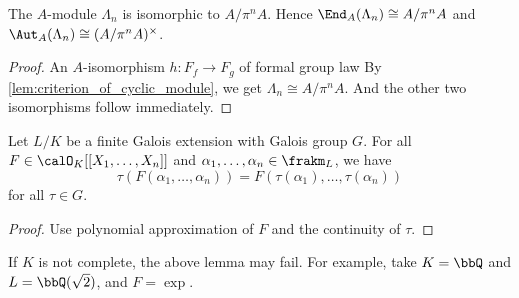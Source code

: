   \begin{proposition}
    The $A$-module $\Lambda_n$ is isomorphic to $A / \pi^n A$.
    Hence $\End_A(\Lambda_n) \cong A / \pi^n A$ and $\Aut_A(\Lambda_n) \cong (A / \pi^n A)^\times$.
  \end{proposition}
  \begin{proof}
    An $A$-isomorphism $h: F_f \to F_g$ of formal group law 
    \Yang{}
    By \cref{lem:criterion_of_cyclic_module}, we get $\Lambda_n \cong A / \pi^n A$.
    And the other two isomorphisms follow immediately.
  \end{proof}

  \begin{lemma}\label{lem:Galois_action_on_power_series_over_complete_field}
    Let $L/K$ be a finite Galois extension with Galois group $G$.
    For all $F \in \calO_K[[X_1, \ldots, X_n]]$ and $\alpha_1, \ldots, \alpha_n \in \frakm_L$, we have
    \[ \tau(F(\alpha_1, \ldots, \alpha_n)) = F(\tau(\alpha_1), \ldots, \tau(\alpha_n)) \]
    for all $\tau \in G$.
  \end{lemma}
  \begin{proof}
    Use polynomial approximation of $F$ and the continuity of $\tau$.
  \end{proof}

  \begin{remark}
    If $K$ is not complete, the above lemma may fail.
    For example, take $K = \bbQ$ and $L = \bbQ(\sqrt{2})$, and $F = \exp$.
  \end{remark}

